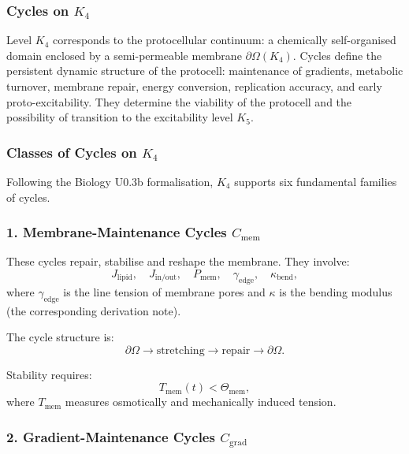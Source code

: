 
\subsubsection{Cycles on \texorpdfstring{$K_4$}{K_4}}
\label{sec:cycles-k4}

Level $K_4$ corresponds to the protocellular continuum: 
a chemically self-organised domain enclosed by a semi-permeable
membrane $\partial\Omega(K_4)$.
Cycles define the persistent dynamic structure of the protocell:
maintenance of gradients, metabolic turnover, membrane repair,
energy conversion, replication accuracy, and early proto-excitability.
They determine the viability of the protocell and the possibility
of transition to the excitability level $K_5$.

\subsubsection{Classes of Cycles on \texorpdfstring{$K_4$}{K_4}}

Following the Biology U0.3b formalisation, $K_4$ supports six
fundamental families of cycles.

\subsubsection{1. Membrane-Maintenance Cycles $C_{\mathrm{mem}}$}

These cycles repair, stabilise and reshape the membrane.
They involve:
\[
  J_{\mathrm{lipid}},\quad
  J_{\mathrm{in/out}},\quad
  P_{\mathrm{mem}},\quad
  \gamma_{\mathrm{edge}},\quad
  \kappa_{\mathrm{bend}},
\]
where $\gamma_{\mathrm{edge}}$ is the line tension of membrane pores
and $\kappa$ is the bending modulus (the corresponding derivation note).

The cycle structure is:
\[
  \partial\Omega \to 
  \mathrm{stretching} \to 
  \mathrm{repair} \to 
  \partial\Omega.
\]

Stability requires:
\[
  T_{\mathrm{mem}}(t) < \Theta_{\mathrm{mem}},
\]
where $T_{\mathrm{mem}}$ measures osmotically and mechanically
induced tension.

\subsubsection{2. Gradient-Maintenance Cycles $C_{\mathrm{grad}}$}

